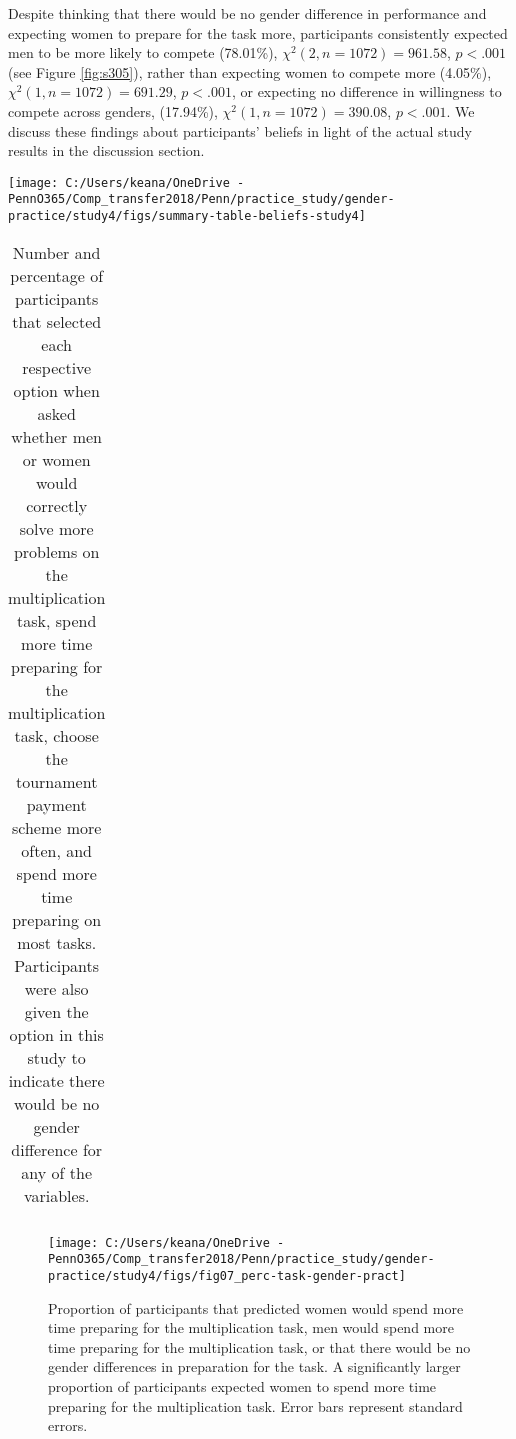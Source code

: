 \documentclass[letterpaper, nobind]{templates/ociamthesis}
\begin{document}
Despite thinking that there would be no gender difference in performance and expecting women to prepare for the task more, participants consistently expected men to be more likely to compete (78.01\%), \(\chi^2(2, n = 1072) = 961.58\), \(p < .001\) (see Figure \ref{fig:s305}), rather than expecting women to compete more (4.05\%), \(\chi^2(1, n = 1072) = 691.29\), \(p < .001\), or expecting no difference in willingness to compete across genders, (17.94\%), \(\chi^2(1, n = 1072) = 390.08\), \(p < .001\). We discuss these findings about participants' beliefs in light of the actual study results in the discussion section.

\begin{center}\texttt{[image: C:/Users/keana/OneDrive - PennO365/Comp\_transfer2018/Penn/practice\_study/gender-practice/study4/figs/summary-table-beliefs-study4]} \end{center}

\begin{table}[ht]
\centering
\begingroup\fontsize{0.1pt}{0.1pt}\selectfont
\begin{tabular}{r}
   \\ 
 \end{tabular}
\endgroup
\caption{Number and percentage of participants that selected each respective option when asked whether men or women would correctly solve more problems on the multiplication task, spend more time preparing for the multiplication task, choose the tournament payment scheme more often, and spend more time preparing on most tasks. Participants were also given the option in this study to indicate there would be no gender difference for any of the variables.} 
\label{tab:summary-table-beliefs-study4}
\end{table}

\newpage
\begin{figure}

{\centering \texttt{[image: C:/Users/keana/OneDrive - PennO365/Comp\_transfer2018/Penn/practice\_study/gender-practice/study4/figs/fig07\_perc-task-gender-pract]} 

}

\caption{Proportion of participants that predicted women would spend more time preparing for the multiplication task, men would spend more time preparing for the multiplication task, or that there would be no gender differences in preparation for the task. A significantly larger proportion of participants expected women to spend more time preparing for the multiplication task. Error bars represent standard errors.}\label{fig:s303}
\end{figure}
\end{document}
